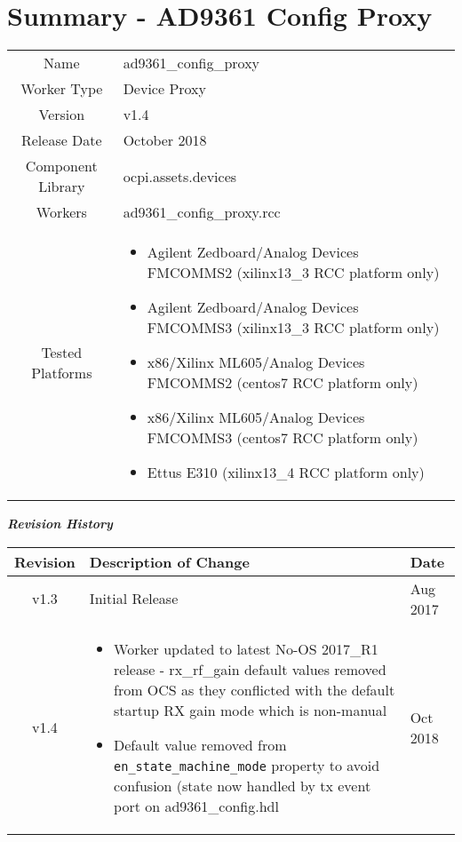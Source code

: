 \documentclass{article}
\author{} %
\date{Version \docVersion} %
\title{\docTitle}
\def\docVersion{1.4}
\def\comp{ad9361\_config\_proxy}
\def\Comp{AD9361 Config Proxy}
\begin{document}
\section*{Summary - \Comp}
\begin{tabular}{|c|M{13.85cm}|}
	\hline
	                  &                  \\
	\hline
	Name              & \comp            \\
	\hline
	Worker Type       & Device Proxy     \\
	\hline
	Version           & v\docVersion{}   \\
	\hline
	Release Date      & October 2018         \\
	\hline
	Component Library & ocpi.assets.devices     \\
	\hline
	Workers           & \comp.rcc        \\
	\hline
	Tested Platforms  &
\begin{itemize}
  \item Agilent Zedboard/Analog Devices FMCOMMS2 (xilinx13\_3 RCC platform only)
  \item Agilent Zedboard/Analog Devices FMCOMMS3 (xilinx13\_3 RCC platform only)
  \item x86/Xilinx ML605/Analog Devices FMCOMMS2 (centos7 RCC platform only)
  \item x86/Xilinx ML605/Analog Devices FMCOMMS3 (centos7 RCC platform only)
  \item Ettus E310 (xilinx13\_4 RCC platform only)
\end{itemize} \\

	\hline
\end{tabular}

	\begin{center}
	\textit{\textbf{Revision History}}
		\begin{table}[H]
		\label{table:revisions} %
			\begin{tabularx}{\textwidth}{|c|X|l|}
			\hline
			\rowcolor{blue}
			\textbf{Revision} & \textbf{Description of Change} & \textbf{Date} \\
		    \hline
		    v1.3 & Initial Release & Aug 2017 \\
		    \hline
        v1.4 & \begin{itemize} \item Worker updated to latest No-OS 2017\_R1 release - rx\_rf\_gain default values removed from OCS as they conflicted with the default startup RX gain mode which is non-manual \item Default value removed from \verb+en_state_machine_mode+ property to avoid confusion (state now handled by tx event port on ad9361\_config.hdl \end{itemize} & Oct 2018 \\
		    \hline
			\end{tabularx}
		\end{table}
	\end{center}
\end{document}
